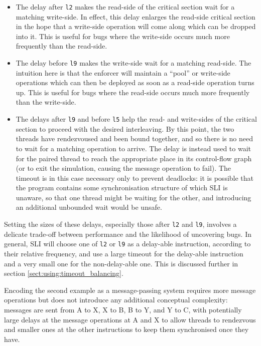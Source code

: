 \begin{itemize}
\item
  The delay after \verb|l2| makes the read-side of the critical
  section wait for a matching write-side.  In effect, this delay
  enlarges the read-side critical section in the hope that a
  write-side operation will come along which can be dropped into it.
  This is useful for bugs where the write-side occurs much more
  frequently than the read-side.
\item
  The delay before \verb|l9| makes the write-side wait for a matching
  read-side.  The intuition here is that the enforcer will maintain a
  ``pool'' or write-side operations which can then be deployed as soon
  as a read-side operation turns up.  This is useful for bugs where
  the read-side occurs much more frequently than the write-side.
\item
  The delays after \verb|l9| and before \verb|l5| help the read- and
  write-sides of the critical section to proceed with the desired
  interleaving.  By this point, the two threads have rendezvoused and
  been bound together, and so there is no need to wait for a matching
  operation to arrive.  The delay is instead used to wait for the
  paired thread to reach the appropriate place in its control-flow
  graph (or to exit the simulation, causing the message operation to
  fail).  The timeout is in this case necessary only to prevent
  deadlocks: it is possible that the program contains some
  synchronisation structure of which SLI is unaware, so that one
  thread might be waiting for the other, and introducing an additional
  unbounded wait would be unsafe.

\end{itemize}

Setting the sizes of these delays, especially those after \verb|l2|
and \verb|l9|, involves a delicate trade-off between performance and
the likelihood of uncovering bugs.  In general, SLI will choose one of
\verb|l2| or \verb|l9| as a delay-able instruction, according to their
relative frequency, and use a large timeout for the delay-able
instruction and a very small one for the non-delay-able one.  This is
discussed further in section \ref{sect:using:timeout_balancing}.

Encoding the second example as a message-passing system requires more
message operations but does not introduce any additional conceptual
complexity: messages are sent from A to X, X to B, B to Y, and Y to C,
with potentially large delays at the message operations at A and X to
allow threads to rendezvous and smaller ones at the other instructions
to keep them synchronised once they have.

